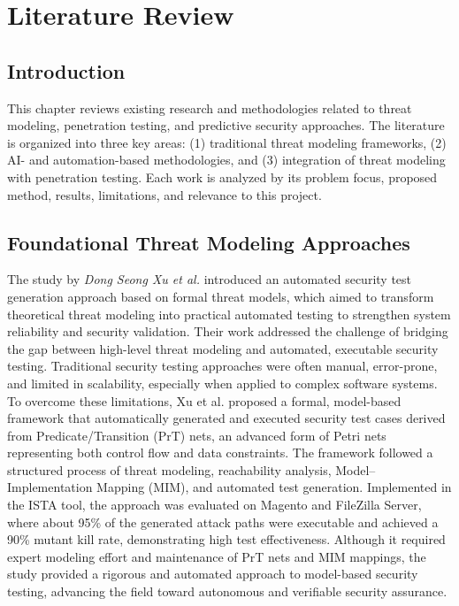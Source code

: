 \chapter{Literature Review}
\label{ch:chapter2}

\section{Introduction}

This chapter reviews existing research and methodologies related to threat modeling, penetration testing, and predictive security approaches. The literature is organized into three key areas: (1) traditional threat modeling frameworks, (2) AI- and automation-based methodologies, and (3) integration of threat modeling with penetration testing. Each work is analyzed by its problem focus, proposed method, results, limitations, and relevance to this project.

\section{Foundational Threat Modeling Approaches}

The study by \textit{Dong Seong Xu et al.} introduced an automated security test generation approach based on formal threat models, which aimed to transform theoretical threat modeling into practical automated testing to strengthen system reliability and security validation. Their work addressed the challenge of bridging the gap between high-level threat modeling and automated, executable security testing. Traditional security testing approaches were often manual, error-prone, and limited in scalability, especially when applied to complex software systems. To overcome these limitations, Xu et al. proposed a formal, model-based framework that automatically generated and executed security test cases derived from Predicate/Transition (PrT) nets, an advanced form of Petri nets representing both control flow and data constraints. The framework followed a structured process of threat modeling, reachability analysis, Model–Implementation Mapping (MIM), and automated test generation. Implemented in the ISTA tool, the approach was evaluated on Magento and FileZilla Server, where about 95\% of the generated attack paths were executable and achieved a 90\% mutant kill rate, demonstrating high test effectiveness. Although it required expert modeling effort and maintenance of PrT nets and MIM mappings, the study provided a rigorous and automated approach to model-based security testing, advancing the field toward autonomous and verifiable security assurance. \cite{xu2012}

